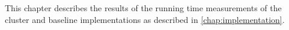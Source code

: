 This chapter describes the results of the running time measurements of the cluster and baseline implementations as described in \ref{chap:implementation}.
